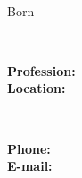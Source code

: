 \documentclass{./../lib/resume}
\begin{document}
\iftoggle{Dev}{\par}{}
\noindent\parbox{56mm}
{\parbox{56mm}{\centering\Huge\bfseries\color{cyan}\fullName}\\\parbox{56mm}{\centering Born \bornData}}\parbox{2mm}{\ }\parbox{65mm}
{\textbf{Profession:} \ProfessionI\\\textbf{Location:} \fullAddress}\parbox{2mm}{\ }\parbox{65mm}
{\textbf{Phone:} \mobilePhoneI\\\textbf{E-mail:} \emailI}

\descriptions

\craft

\workExperience

\teaching

\project

\education

\publication

\LicensesCertifications

\honorsAwards

\training
\end{document}

